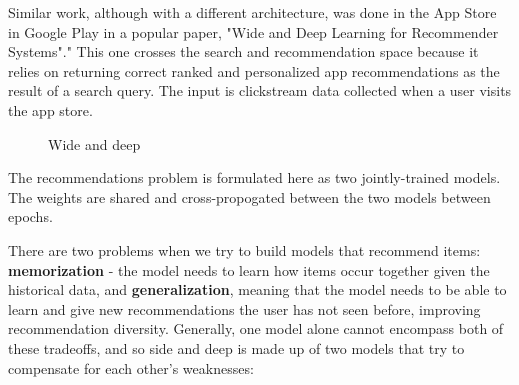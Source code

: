 \documentclass[11pt, table]{diazessay} %
\begin{document}
\begin{sloppypar}
Similar work, although with a different architecture, was done in the App Store in Google Play in a popular paper, "Wide and Deep Learning for Recommender Systems"\citep{cheng2016wide}." This one crosses the search and recommendation space because it relies on returning correct ranked and personalized app recommendations as the result of a search query.  The input is clickstream  data collected when a user visits the app store. 


\begin{figure}[H]
\caption{Wide and deep\citep{cheng2016wide}}
\end{figure}

The recommendations problem is formulated here as two jointly-trained models. The weights are shared and cross-propogated between the two models between epochs. 

There are two problems when we try to build models that recommend items: \textbf{memorization} - the model needs to learn how items occur together given the historical data, and \textbf{generalization}, meaning that the model needs to be able to learn and give new recommendations the user has not seen before, improving recommendation diversity. Generally, one model alone cannot encompass both of these tradeoffs, and so side and deep is made up of two models that try to compensate for each other's weaknesses: 


\end{sloppypar}
\end{document}
